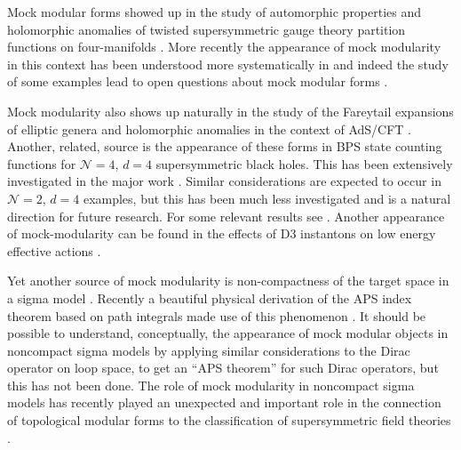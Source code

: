 \documentclass[12pt]{article}
\newcommand\CalN{\mathcal{N}}
\begin{document}
Mock modular forms showed up in the study 
of automorphic properties and holomorphic anomalies of 
twisted supersymmetric gauge theory partition functions 
on four-manifolds \cite{Vafa:1994tf,Moore:1997pc}. More recently 
the appearance of mock modularity in this context has 
been understood more systematically in 
\cite{Dabholkar:2020fde,Korpas:2017qdo,Korpas:2019ava,
Korpas:2019cwg,Manschot:2021qqe}  and indeed the study of some examples 
lead to open questions about mock modular forms 
\cite{Manschot:2021qqe}. 


Mock modularity also shows up naturally in the study of 
the Fareytail expansions of elliptic genera and holomorphic 
anomalies in the context of AdS/CFT \cite{Manschot:2007ha}.  
Another, related, source is the appearance of these forms in 
BPS state counting functions for ${\CalN}=4$, $d=4$ supersymmetric 
black holes. This has been extensively investigated in 
the major work \cite{Dabholkar:2012nd}.   Similar considerations 
are expected to occur in ${\CalN}=2$, $d=4$ examples, but this 
has been much less investigated and is a natural direction 
for future research. For some relevant results see 
\cite{Manschot:2010sxc,Cheng:2017dlj,Alexandrov:2018lgp,Alexandrov:2019rth,Alexandrov:2022pgd}.
  Another appearance of mock-modularity 
can be found in the effects of D3 instantons on low energy 
effective actions  \cite{Alexandrov:2016tnf,Alexandrov:2017qhn}.

Yet another source of mock modularity is non-compactness 
of the target space in a sigma model
\cite{Eguchi:2008gc,Eguchi:2009cq,Eguchi:2010cb,Harvey:2013mda,
Harvey:2014cva,Murthy:2013mya,Sugawara:2011vg,Troost:2010ud,Troost:2017fpk}.
Recently a beautiful physical 
derivation of the APS index theorem based on path integrals 
made use of this phenomenon \cite{Dabholkar:2019nnc}. 
It should be possible to understand, conceptually, 
the appearance of mock modular objects in  
noncompact sigma models by applying similar considerations 
to the Dirac operator on loop space, to get an ``APS theorem'' 
for such Dirac operators, but this has not been 
done. The role of mock modularity in noncompact sigma models 
has recently played an unexpected and important role in the connection of topological modular
forms to the classification of supersymmetric field theories 
\cite{Gaiotto:2019gef}. 
\end{document}
